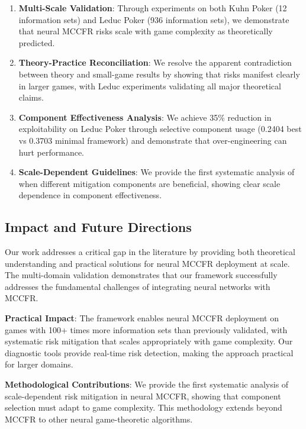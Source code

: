 \documentclass[12pt,a4paper]{article}
\begin{document}
\begin{enumerate}
\item \textbf{Multi-Scale Validation}: Through experiments on both Kuhn Poker (12 information sets) and Leduc Poker (936 information sets), we demonstrate that neural MCCFR risks scale with game complexity as theoretically predicted.

\item \textbf{Theory-Practice Reconciliation}: We resolve the apparent contradiction between theory and small-game results by showing that risks manifest clearly in larger games, with Leduc experiments validating all major theoretical claims.

\item \textbf{Component Effectiveness Analysis}: We achieve 35\% reduction in exploitability on Leduc Poker through selective component usage (0.2404 best vs 0.3703 minimal framework) and demonstrate that over-engineering can hurt performance.

\item \textbf{Scale-Dependent Guidelines}: We provide the first systematic analysis of when different mitigation components are beneficial, showing clear scale dependence in component effectiveness.
\end{enumerate}

\subsection{Impact and Future Directions}

Our work addresses a critical gap in the literature by providing both theoretical understanding and practical solutions for neural MCCFR deployment at scale. The multi-domain validation demonstrates that our framework successfully addresses the fundamental challenges of integrating neural networks with MCCFR.

\textbf{Practical Impact}: The framework enables neural MCCFR deployment on games with 100+ times more information sets than previously validated, with systematic risk mitigation that scales appropriately with game complexity. Our diagnostic tools provide real-time risk detection, making the approach practical for larger domains.

\textbf{Methodological Contributions}: We provide the first systematic analysis of scale-dependent risk mitigation in neural MCCFR, showing that component selection must adapt to game complexity. This methodology extends beyond MCCFR to other neural game-theoretic algorithms.
\end{document}
